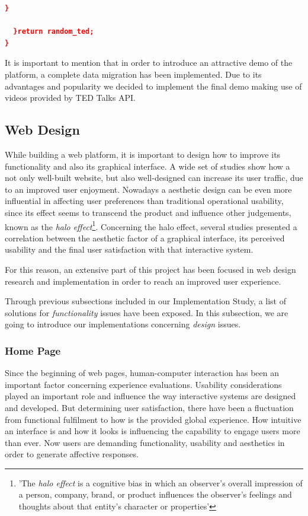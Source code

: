 \documentclass{acm_proc_article-sp}
\begin{document}
\begin{lstlisting}[language=json,firstnumber=1]
      }
      
  }return random_ted; 
}
\end{lstlisting}

It is important to mention that in order to introduce an attractive demo of the platform, a complete data migration has been implemented. Due to its advantages and popularity we decided to implement the final demo making use of videos provided by TED Talks API\cite{cettolo2012wit3}.

\subsection{Web Design}
While building a web platform, it is important to design how to improve its functionality and also its graphical interface. A wide set of studies \cite{allen2012smashing} show how a not only well-built website, but also well-designed can increase its user traffic, due to an improved user enjoyment. Nowadays a aesthetic design 
can be even more influential in affecting user preferences 
than traditional operational usability, since its effect seems to transcend the product and influence other judgements, known as the \textit{halo effect}\cite{de2006interaction}\cite{wiki:halo}\footnote{'The \textit{halo effect} is a cognitive bias in which an observer's overall impression of a person, company, brand, or product influences the observer's feelings and thoughts about that entity's character or properties'}. Concerning the halo effect, several studies \cite{de2006interaction} presented a correlation between the aesthetic factor of a graphical interface, its perceived usability and the final user satisfaction with that interactive system. 

For this reason, an extensive part of this project has been focused in web design research and implementation in order to reach an improved user experience. 

Through previous subsections included in our Implementation Study, a list of solutions for \textit{functionality} issues have been exposed. In this subsection, we are going to introduce our implementations concerning \textit{design} issues. 

\subsubsection{Home Page}
Since the beginning of web pages, human-computer interaction has been an important factor concerning experience evaluations\cite{monk2004product}. Usability considerations played an important role and influence the way interactive systems are designed and developed\cite{green2003pleasure}. But determining user satisfaction, there have been a  fluctuation from functional fulfilment to how is the provided global experience\cite{de2006interaction}. How intuitive an interface is and how it looks is influencing the capability to engage users more than ever\cite{allen2012smashing}. Now users are demanding functionality, usability and aesthetics in order to generate affective responses. 
\end{document}
